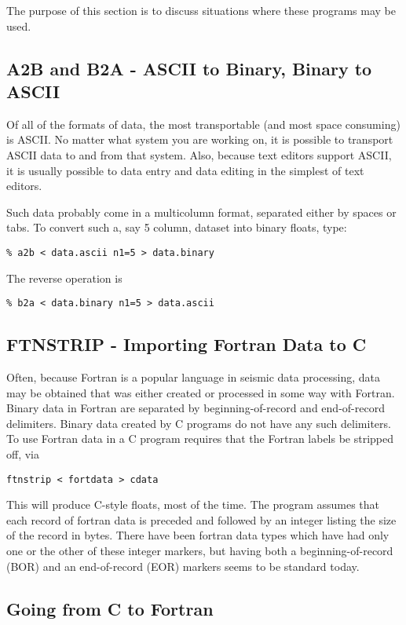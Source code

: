 {{{The purpose of this section is to discuss situations where these
programs may be used.
\subsection{A2B and B2A - ASCII to Binary, Binary to ASCII}

Of all of the formats of data, the most transportable (and most 
space consuming) is ASCII. No matter what system you are working
on, it is possible to transport ASCII data to and from that system.
Also, because text editors support ASCII, it is usually possible to
data entry and data editing in the simplest of text editors.

Such data probably come in a multicolumn format, separated either
by spaces or tabs. To convert such a, say 5 column, dataset into
binary floats, type:
{\small\begin{verbatim}
% a2b < data.ascii n1=5 > data.binary 
\end{verbatim}}\noindent
The reverse operation is
{\small\begin{verbatim}
% b2a < data.binary n1=5 > data.ascii 
\end{verbatim}}\noindent

\subsection{FTNSTRIP - Importing Fortran Data to C}
Often, because Fortran is a popular language in seismic data processing,
data may be obtained that was either created or processed in some
way with Fortran.
Binary data in Fortran are separated by beginning-of-record
and end-of-record delimiters. Binary data created by C programs do not have
any such delimiters.
To use Fortran data in a C program requires that the Fortran labels
be stripped off, via
{\small\begin{verbatim}
ftnstrip < fortdata > cdata
\end{verbatim}}\noindent
This will produce C-style floats, most of the time.
The program assumes that each record of fortran data is preceded
and followed by an integer listing the size of the record in bytes.
There have been fortran data types which have had only one or the
other of these integer markers, but having both a beginning-of-record
(BOR) and an end-of-record (EOR) markers seems to be standard today.

\subsection{Going from C to Fortran}

}}}
